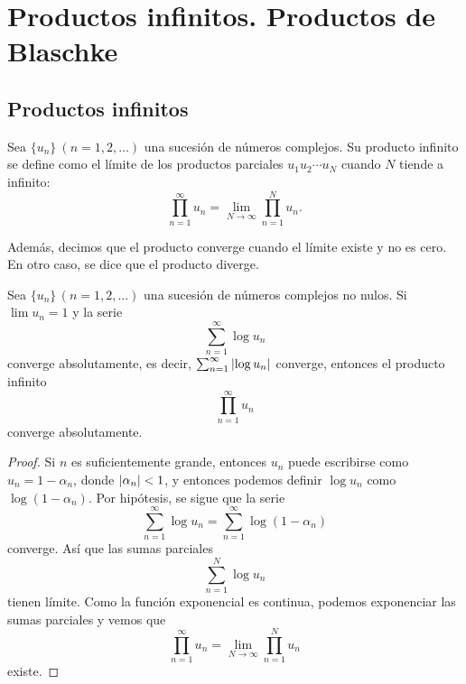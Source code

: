 \chapter{Productos infinitos. Productos de Blaschke}

\section{Productos infinitos}

\begin{definition}
    Sea $\{u_n\} \ (n=1,2, \dots)$ una sucesión de números complejos. Su producto infinito se define como el límite de los productos parciales $u_1 u_2 \cdots u_N$ cuando $N$ tiende a infinito:
\begin{equation*}
    \prod_{n=1}^{\infty} u_n = \lim_{N \to \infty} \prod_{n=1}^{N} u_n.
\end{equation*}

Además, decimos que el producto converge cuando el límite existe y no es cero. En otro caso, se dice que el producto diverge. \\
\end{definition}


\begin{prop}
    Sea $\{u_n\} \, (n=1,2, \dots)$ una sucesión de números complejos no nulos. Si $\lim u_n =1$ y la serie
    \begin{equation*}
        \sum_{n=1}^{\infty} \log u_n
    \end{equation*}
    converge absolutamente, es decir, $ \sum_{n=1}^{\infty} \left\lvert\log u_n\right\rvert$ converge, entonces el producto infinito
    \begin{equation*}
        \prod_{n=1}^{\infty} u_n
    \end{equation*}
    converge absolutamente.
\end{prop}

\begin{proof}
    Si $n$ es suficientemente grande, entonces $u_n$ puede escribirse como $u_n = 1 - \alpha_n$, donde $\left\lvert\alpha_n\right\rvert < 1$, y entonces podemos definir $\log{u_n}$ como $\log{(1 - \alpha_n)}$. Por hipótesis, se sigue que la serie
    \begin{equation*}
        \sum_{n=1}^{\infty} \log u_n = \sum_{n=1}^{\infty} \log{(1 - \alpha_n)}
    \end{equation*}
    converge. Así que las sumas parciales
    \begin{equation*}
        \sum_{n=1}^{N} \log u_n
    \end{equation*}
    tienen límite. Como la función exponencial es continua, podemos exponenciar las sumas parciales y vemos que
    \begin{equation*}
        \prod_{n=1}^{\infty} u_n = \lim_{N \to \infty} \prod_{n=1}^{N} u_n
    \end{equation*}
    existe.
\end{proof}

